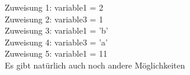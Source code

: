 Zuweisung 1: variable1 = 2 \\
Zuweisung 2: variable3 = 1 \\
Zuweisung 3: variable1 = 'b' \\
Zuweisung 4: variable3 = 'a' \\
Zuweisung 5: variable1 = 11 \\
Es gibt natürlich auch noch andere Möglichkeiten